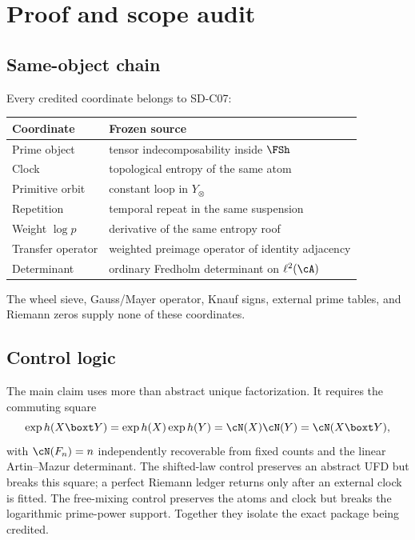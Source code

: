 \section{Proof and scope audit}

\subsection{Same-object chain}

Every credited coordinate belongs to SD-C07:

\begin{center}
\begin{tabularx}{0.96\textwidth}{L{0.20\textwidth}X}
\toprule
Coordinate & Frozen source \\
\midrule
Prime object & tensor indecomposability inside $\FSh$ \\
Clock & topological entropy of the same atom \\
Primitive orbit & constant loop in $Y_\otimes$ \\
Repetition & temporal repeat in the same suspension \\
Weight $\log p$ & derivative of the same entropy roof \\
Transfer operator & weighted preimage operator of identity adjacency \\
Determinant & ordinary Fredholm determinant on $\ell^2(\cA)$ \\
\bottomrule
\end{tabularx}
\end{center}

The wheel sieve, Gauss/Mayer operator, Knauf signs, external prime tables, and
Riemann zeros supply none of these coordinates.

\subsection{Control logic}

The main claim uses more than abstract unique factorization.  It requires the
commuting square
\[
 \exp h(X\boxt Y)=\exp h(X)\exp h(Y)
 =\cN(X)\cN(Y)=\cN(X\boxt Y),
\]
with $\cN(F_n)=n$ independently recoverable from fixed counts and the linear
Artin--Mazur determinant.  The shifted-law control preserves an abstract UFD
but breaks this square; a perfect Riemann ledger returns only after an
external clock is fitted.  The free-mixing control preserves the atoms and
clock but breaks the logarithmic prime-power support.  Together they isolate
the exact package being credited.


